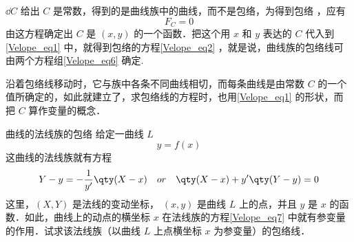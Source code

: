 $\dd C$ 给出 $C$ 是常数，得到的是曲线族中的曲线，而不是包络，为得到包络
，应有
\begin{equation}
F_C=0
\end{equation}
由这方程确定出 $C$ 是 $(x,y)$ 的一个函数．把这个用 $x$ 和 $y$ 表达的 $C$ 代入到\autoref{Velope_eq1} 中，就得到包络的方程\autoref{Velope_eq2} ，就是说，曲线族的包络线可由两个方程组\autoref{Velope_eq6} 确定.

沿着包络线移动时，它与族中各条不同曲线相切，而每条曲线是由常数 $C$ 的一个值所确定的，如此就建立了，求包络线的方程时，也用\autoref{Velope_eq1} 的形状，而把 $C$ 算作变量的概念．
\begin{example}{曲线的法线族的包络}
给定一曲线 $L$
\begin{equation}
y=f(x)
\end{equation}
这曲线的法线族就有方程
\begin{equation}\label{Velope_eq7}
Y-y=-\frac{1}{y'}\qty(X-x)\quad or\quad\qty(X-x)+y'\qty(Y-y)=0
\end{equation}
这里，$(X,Y)$ 是法线的变动坐标， $(x,y)$ 是曲线 $L$ 上的点，并且 $y$ 是 $x$ 的函数．如此，曲线上的动点的横坐标 $x$ 在法线族的方程\autoref{Velope_eq7} 中就有参变量的作用．试求该法线族（以曲线 $L$ 上点横坐标 $x$ 为参变量）的包络线．
\end{example}
